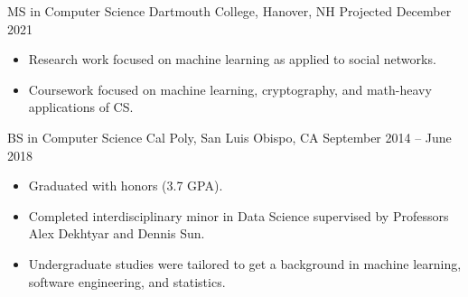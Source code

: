 \vspace{3.5mm}
\sffamily




\datedentry
    {MS in Computer Science}
    {Dartmouth College, Hanover, NH}
    {Projected December 2021}
    {}
\begin{itemize}
    \setlength{\itemindent}{-0.8em}
    \item Research work focused on machine learning as applied to social networks.
    \item Coursework focused on machine learning, cryptography, and math-heavy applications of CS.
\end{itemize}
\divider

\datedentry
    {BS in Computer Science}
    {Cal Poly, San Luis Obispo, CA}
    {September 2014 -- June 2018}
    {}

\begin{itemize}
    \setlength{\itemindent}{-0.8em}
    \item Graduated with honors (3.7 GPA).
    \item Completed interdisciplinary minor in Data Science supervised by Professors Alex Dekhtyar and Dennis Sun.
    \item Undergraduate studies were tailored to get a background in machine learning, software engineering, and statistics.
\end{itemize}

\medskip




\medskip


\smallskip

